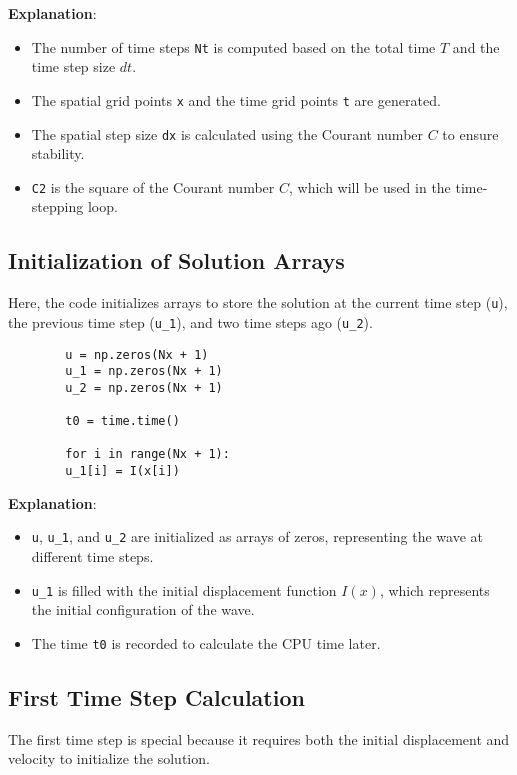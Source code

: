 \documentclass[a4paper, 11pt]{article}
\begin{document}
	\textbf{Explanation}:
	\begin{itemize}
		\item The number of time steps \texttt{Nt} is computed based on the total time $T$ and the time step size $dt$.
		\item The spatial grid points \texttt{x} and the time grid points \texttt{t} are generated.
		\item The spatial step size \texttt{dx} is calculated using the Courant number $C$ to ensure stability.
		\item \texttt{C2} is the square of the Courant number $C$, which will be used in the time-stepping loop.
	\end{itemize}
	
	\subsection{Initialization of Solution Arrays}
	
	Here, the code initializes arrays to store the solution at the current time step (\texttt{u}), the previous time step (\texttt{u\_1}), and two time steps ago (\texttt{u\_2}).
	
	\lstset{language=Python}
	\begin{lstlisting}
		u = np.zeros(Nx + 1)
		u_1 = np.zeros(Nx + 1)
		u_2 = np.zeros(Nx + 1)
		
		t0 = time.time()
		
		for i in range(Nx + 1):
		u_1[i] = I(x[i])
	\end{lstlisting}
	
	\textbf{Explanation}:
	\begin{itemize}
		\item \texttt{u}, \texttt{u\_1}, and \texttt{u\_2} are initialized as arrays of zeros, representing the wave at different time steps.
		\item \texttt{u\_1} is filled with the initial displacement function $I(x)$, which represents the initial configuration of the wave.
		\item The time \texttt{t0} is recorded to calculate the CPU time later.
	\end{itemize}
	
	\subsection{First Time Step Calculation}
	
	The first time step is special because it requires both the initial displacement and velocity to initialize the solution.
	
\end{document}
